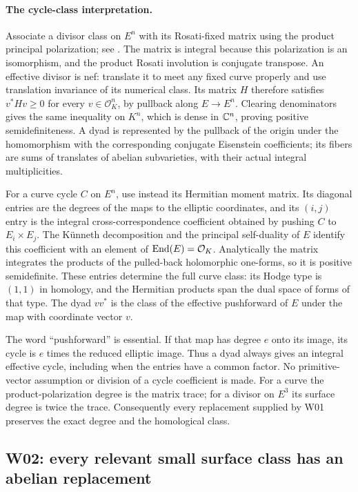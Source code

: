 \paragraph{The cycle-class interpretation.}
Associate a divisor class on $E^n$ with its Rosati-fixed matrix using the product principal polarization; see \cite[Proposition 17.2, p.~35]{MilneAV}. The matrix is integral because this polarization is an isomorphism, and the product Rosati involution is conjugate transpose. An effective divisor is nef: translate it to meet any fixed curve properly and use translation invariance of its numerical class. Its matrix $H$ therefore satisfies $v^*Hv\geq0$ for every $v\in\mathcal O_K^n$, by pullback along $E\to E^n$. Clearing denominators gives the same inequality on $K^n$, which is dense in $\mathbb C^n$, proving positive semidefiniteness. A dyad is represented by the pullback of the origin under the homomorphism with the corresponding conjugate Eisenstein coefficients; its fibers are sums of translates of abelian subvarieties, with their actual integral multiplicities.

For a curve cycle $C$ on $E^n$, use instead its Hermitian moment matrix. Its diagonal entries are the degrees of the maps to the elliptic coordinates, and its $(i,j)$ entry is the integral cross-correspondence coefficient obtained by pushing $C$ to $E_i\times E_j$. The K\"unneth decomposition and the principal self-duality of $E$ identify this coefficient with an element of $\operatorname{End}(E)=\mathcal O_K$. Analytically the matrix integrates the products of the pulled-back holomorphic one-forms, so it is positive semidefinite. These entries determine the full curve class: its Hodge type is $(1,1)$ in homology, and the Hermitian products span the dual space of forms of that type. The dyad $vv^*$ is the class of the effective pushforward of $E$ under the map with coordinate vector $v$.

The word ``pushforward'' is essential. If that map has degree $e$ onto its image, its cycle is $e$ times the reduced elliptic image. Thus a dyad always gives an integral effective cycle, including when the entries have a common factor. No primitive-vector assumption or division of a cycle coefficient is made. For a curve the product-polarization degree is the matrix trace; for a divisor on $E^3$ its surface degree is twice the trace. Consequently every replacement supplied by W01 preserves the exact degree and the homological class.

\subsection{W02: every relevant small surface class has an abelian replacement}

